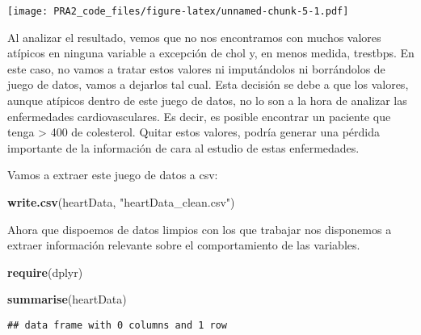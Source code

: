 \documentclass[
]{article}
\newenvironment{Shaded}{\begin{snugshade}}{\end{snugshade}}
\newcommand{\DataTypeTok}[1]{\textcolor[rgb]{0.13,0.29,0.53}{#1}}
\newcommand{\DecValTok}[1]{\textcolor[rgb]{0.00,0.00,0.81}{#1}}
\newcommand{\KeywordTok}[1]{\textcolor[rgb]{0.13,0.29,0.53}{\textbf{#1}}}
\newcommand{\NormalTok}[1]{#1}
\newcommand{\OperatorTok}[1]{\textcolor[rgb]{0.81,0.36,0.00}{\textbf{#1}}}
\newcommand{\StringTok}[1]{\textcolor[rgb]{0.31,0.60,0.02}{#1}}
\begin{document}
\texttt{[image: PRA2\_code\_files/figure-latex/unnamed-chunk-5-1.pdf]}

Al analizar el resultado, vemos que no nos encontramos con muchos
valores atípicos en ninguna variable a excepción de chol y, en menos
medida, trestbps. En este caso, no vamos a tratar estos valores ni
imputándolos ni borrándolos de juego de datos, vamos a dejarlos tal
cual. Esta decisión se debe a que los valores, aunque atípicos dentro de
este juego de datos, no lo son a la hora de analizar las enfermedades
cardiovasculares. Es decir, es posible encontrar un paciente que tenga
\textgreater{} 400 de colesterol. Quitar estos valores, podría generar
una pérdida importante de la información de cara al estudio de estas
enfermedades.

Vamos a extraer este juego de datos a csv:

\begin{Shaded}
\begin{Highlighting}[]
\KeywordTok{write.csv}\NormalTok{(heartData, }\StringTok{"heartData_clean.csv"}\NormalTok{)}
\end{Highlighting}
\end{Shaded}

Ahora que dispoemos de datos limpios con los que trabajar nos disponemos
a extraer información relevante sobre el comportamiento de las
variables.

\begin{Shaded}
\begin{Highlighting}[]
\KeywordTok{require}\NormalTok{(dplyr)}

\KeywordTok{summarise}\NormalTok{(heartData)}
\end{Highlighting}
\end{Shaded}

\begin{verbatim}
## data frame with 0 columns and 1 row
\end{verbatim}

\begin{Shaded}
\end{Shaded}
\end{document}
